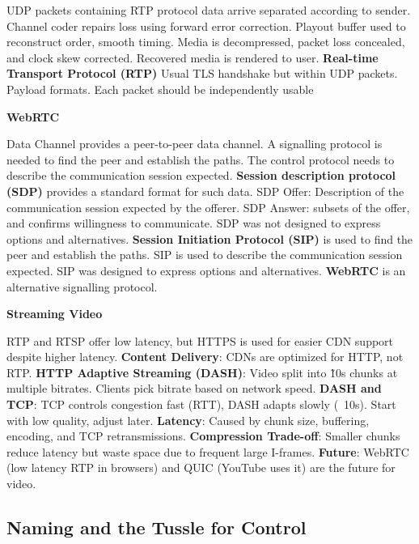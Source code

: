 \documentclass{article}
\begin{document}
UDP packets containing RTP protocol data arrive separated according to sender.
Channel coder repairs loss using forward error correction.
Playout buffer used to reconstruct order, smooth timing.
Media is decompressed, packet loss concealed, and clock skew corrected.
Recovered media is rendered to user.
\textbf{Real-time Transport Protocol (RTP)}
Usual TLS handshake but within UDP packets.
Payload formats.
Each packet should be independently usable

\vspace{\baselineskip}
\textbf{WebRTC}

Data Channel provides a peer-to-peer data channel.
A signalling protocol is needed to find the peer and establish the paths.
The control protocol needs to describe the communication session expected.
\textbf{Session description protocol (SDP)} provides a standard format for such data.
SDP Offer: Description of the communication session expected by the offerer.
SDP Answer: subsets of the offer, and confirms willingness to communicate.
SDP was not designed to express options and alternatives.
\textbf{Session Initiation Protocol (SIP)} is used to find the peer and establish the paths.
SIP is used to describe the communication session expected.
SIP was designed to express options and alternatives.
\textbf{WebRTC} is an alternative signalling protocol.

\vspace{\baselineskip}
\textbf{Streaming Video}

RTP and RTSP offer low latency, but HTTPS is used for easier CDN support despite higher latency.
\textbf{Content Delivery}:
CDNs are optimized for HTTP, not RTP\@.
\textbf{HTTP Adaptive Streaming (DASH)}:
Video split into \~10s chunks at multiple bitrates. Clients pick bitrate based on network speed.
\textbf{DASH and TCP}:
TCP controls congestion fast (RTT), DASH adapts slowly (~10s). Start with low quality, adjust later.
\textbf{Latency}:
Caused by chunk size, buffering, encoding, and TCP retransmissions.
\textbf{Compression Trade-off}:
Smaller chunks reduce latency but waste space due to frequent large I-frames.
\textbf{Future}:
WebRTC (low latency RTP in browsers) and QUIC (YouTube uses it) are the future for video.

\clearpage

\subsection*{Naming and the Tussle for Control}
\end{document}
